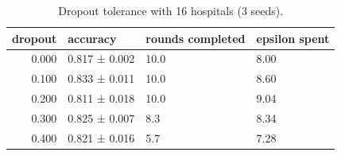 \begin{table}
\caption{Dropout tolerance with 16 hospitals (3 seeds).}
\label{tab:T12_dropout}
\begin{tabular}{rlll}
\toprule
dropout & accuracy & rounds completed & epsilon spent \\
\midrule
0.000 & 0.817 ± 0.002 & 10.0 & 8.00 \\
0.100 & 0.833 ± 0.011 & 10.0 & 8.60 \\
0.200 & 0.811 ± 0.018 & 10.0 & 9.04 \\
0.300 & 0.825 ± 0.007 & 8.3 & 8.34 \\
0.400 & 0.821 ± 0.016 & 5.7 & 7.28 \\
\bottomrule
\end{tabular}
\end{table}
